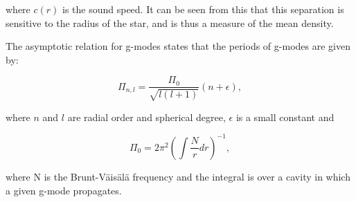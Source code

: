 \noindent where $c(r)$ is the sound speed. It can be seen from this that this separation is sensitive to the radius of the star, and is thus a measure of the mean density. 

The asymptotic relation for g-modes states that the periods of g-modes are given by: 

\begin{equation}
    \Pi_{n,l} = \frac{\Pi_0}{\sqrt{l(l+1)}}(n+\epsilon),
\end{equation}

\noindent where $n$ and $l$ are radial order and spherical degree, $\epsilon$ is a small constant and 

\begin{equation}
    \Pi_{0} = 2\pi^2\left(\int \frac{N}{r} dr\right)^{-1},
\end{equation}

\noindent where N is the Brunt-Väisälä frequency and the integral is over a cavity in which a given g-mode propagates.

